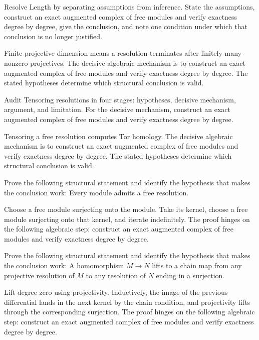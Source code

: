 \begin{problem}\label{prob:v23-problem-07}
Resolve Length by separating assumptions from inference. State the assumptions, construct an exact augmented complex of free modules and verify exactness degree by degree, give the conclusion, and note one condition under which that conclusion is no longer justified.
\end{problem}
\begin{solution}
Finite projective dimension means a resolution terminates after finitely many nonzero projectives. The decisive algebraic mechanism is to construct an exact augmented complex of free modules and verify exactness degree by degree. The stated hypotheses determine which structural conclusion is valid.
\end{solution}

\begin{problem}\label{prob:v23-problem-08}
Audit Tensoring resolutions in four stages: hypotheses, decisive mechanism, argument, and limitation. For the decisive mechanism, construct an exact augmented complex of free modules and verify exactness degree by degree.
\end{problem}
\begin{solution}
Tensoring a free resolution computes Tor homology. The decisive algebraic mechanism is to construct an exact augmented complex of free modules and verify exactness degree by degree. The stated hypotheses determine which structural conclusion is valid.
\end{solution}

\begin{problem}\label{prob:v23-problem-09}
Prove the following structural statement and identify the hypothesis that makes the conclusion work: Every module admits a free resolution.
\end{problem}
\begin{solution}
Choose a free module surjecting onto the module. Take its kernel, choose a free module surjecting onto that kernel, and iterate indefinitely. The proof hinges on the following algebraic step: construct an exact augmented complex of free modules and verify exactness degree by degree.
\end{solution}

\begin{problem}\label{prob:v23-problem-10}
Prove the following structural statement and identify the hypothesis that makes the conclusion work: A homomorphism $M\to N$ lifts to a chain map from any projective resolution of $M$ to any resolution of $N$ ending in a surjection.
\end{problem}
\begin{solution}
Lift degree zero using projectivity. Inductively, the image of the previous differential lands in the next kernel by the chain condition, and projectivity lifts through the corresponding surjection. The proof hinges on the following algebraic step: construct an exact augmented complex of free modules and verify exactness degree by degree.
\end{solution}

